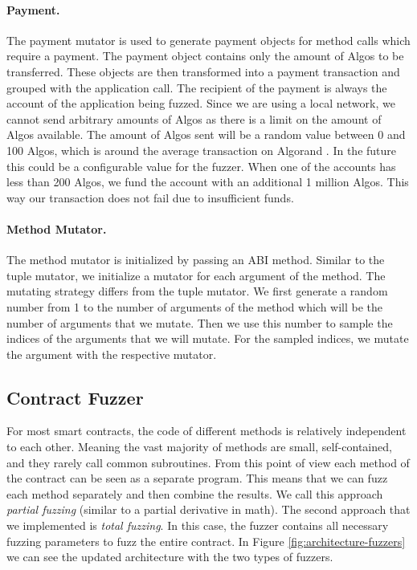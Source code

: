 \paragraph{Payment.}
The payment mutator is used to generate payment objects for method calls which require a payment.
The payment object contains only the amount of Algos to be transferred.
These objects are then transformed into a payment transaction and grouped with the application call.
The recipient of the payment is always the account of the application being fuzzed.
Since we are using a local network, we cannot send arbitrary amounts of Algos as there is a limit on the amount of Algos available.
The amount of Algos sent will be a random value between 0 and 100 Algos, which is around the average transaction on Algorand \cite{noauthor_algorand_nodate}.
In the future this could be a configurable value for the fuzzer.
When one of the accounts has less than 200 Algos, we fund the account with an additional 1 million Algos.
This way our transaction does not fail due to insufficient funds.


\paragraph{Method Mutator.}
The method mutator is initialized by passing an \ac{ABI} method.
Similar to the tuple mutator, we initialize a mutator for each argument of the method.
The mutating strategy differs from the tuple mutator.
We first generate a random number from 1 to the number of arguments of the method which will be the number of arguments that we mutate.
Then we use this number to sample the indices of the arguments that we will mutate.
For the sampled indices, we mutate the argument with the respective mutator.


\subsection*{Contract Fuzzer}
For most smart contracts, the code of different methods is relatively independent to each other.
Meaning the vast majority of methods are small, self-contained, and they rarely call common subroutines.
From this point of view each method of the contract can be seen as a separate program.
This means that we can fuzz each method separately and then combine the results.
We call this approach \textit{partial fuzzing} (similar to a partial derivative in math). The second approach that we implemented is \textit{total fuzzing}.
In this case, the fuzzer contains all necessary fuzzing parameters to fuzz the entire contract.
In Figure \ref{fig:architecture-fuzzers} we can see the updated architecture with the two types of fuzzers.

